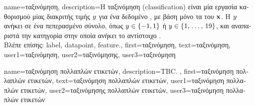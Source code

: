{name={\foreignlanguage{greek}{ταξινόμηση}},
	description={\foreignlanguage{greek}{Η ταξινόμηση} (classification) 
 		\foreignlanguage{greek}{είναι μία εργασία καθορισμού μίας}  \foreignlanguage{greek}{διακριτής τιμής} $y$ 
		\foreignlanguage{greek}{για ένα δεδομένο} , \foreignlanguage{greek}{με βάση μόνο τα}  
 		 \foreignlanguage{greek}{του} ${\bf x}$. \foreignlanguage{greek}{Η}  $y$ 
		\foreignlanguage{greek}{ανήκει σε ένα πεπερασμένο σύνολο, όπως $y \in \{-1,1\}$ ή $y \in \{1, \,\ldots, \,19\}$, 
		και αναπαριστά την κατηγορία στην οποία ανήκει το αντίστοιχο} .
		\\
		\foreignlanguage{greek}{Βλέπε επίσης:} \gls{label}, \gls{datapoint}, \gls{feature}.},
	first={\foreignlanguage{greek}{ταξινόμηση}},
	text={\foreignlanguage{greek}{ταξινόμηση}},
	user1={\foreignlanguage{greek}{ταξινόμηση}}, %
	user2={\foreignlanguage{greek}{ταξινόμησης}}, %
	user3={\foreignlanguage{greek}{ταξινόμηση}} %
}

{name={\foreignlanguage{greek}{ταξινόμηση πολλαπλών ετικετών}}, 
	description={TBC. },
	first={\foreignlanguage{greek}{ταξινόμηση πολλαπλών ετικετών}},
	text={\foreignlanguage{greek}{ταξινόμηση πολλαπλών ετικετών}},
	user1={\foreignlanguage{greek}{ταξινόμηση πολλαπλών ετικετών}}, %
	user2={\foreignlanguage{greek}{ταξινόμησης πολλαπλών ετικετών}}, %
	user3={\foreignlanguage{greek}{ταξινόμηση πολλαπλών ετικετών}} %
}

